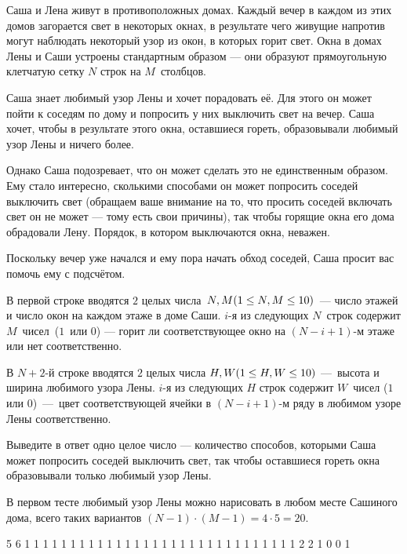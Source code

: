 
Саша и Лена живут в противоположных домах. Каждый вечер в каждом из этих домов загорается свет в некоторых окнах, в результате чего живущие напротив могут наблюдать некоторый узор из окон, в которых горит свет. Окна в домах Лены и Саши устроены стандартным образом — они образуют прямоугольную клетчатую сетку $N$ строк на $M$ столбцов.

Саша знает любимый узор Лены и хочет порадовать её. Для этого он может пойти к соседям по дому и попросить у них выключить свет на вечер. Саша хочет, чтобы в результате этого окна, оставшиеся гореть, образовывали любимый узор Лены и ничего более. 

Однако Саша подозревает, что он может сделать это не единственным образом. Ему стало интересно, сколькими способами он может попросить соседей выключить свет (обращаем ваше внимание на то, что просить соседей включать свет он не может — тому есть свои причины), так чтобы горящие окна его дома обрадовали Лену. Порядок, в котором выключаются окна, неважен.

Поскольку вечер уже начался и ему пора начать обход соседей, Саша просит вас помочь ему с подсчётом.


В первой строке вводятся $2$ целых числа $N, M \space (1\leq N, M \leq 10)$ — число этажей и число окон на каждом этаже в доме Саши. $i$-я из следующих $N$ строк содержит $M$ чисел ($1$ или $0$) — горит ли соответствующее окно на $(N-i+1)$-м этаже или нет соответственно.

В $N+2$-й строке вводятся $2$ целых числа $H, W\space(1\leq H,W \leq 10)$ — высота и ширина любимого узора Лены. $i$-я из следующих $H$ строк содержит $W$ чисел ($1$ или $0$) — цвет соответствующей ячейки в $(N-i+1)$-м ряду в любимом узоре Лены соответственно.

\outputfmtSection

Выведите в ответ одно целое число — количество способов, которыми Саша может попросить соседей выключить свет, так чтобы оставшиеся гореть окна образовывали только любимый узор Лены.

\explanationSection

В первом тесте любимый узор Лены можно нарисовать в любом месте Сашиного дома, всего таких вариантов $(N - 1) \cdot (M - 1) = 4 \cdot 5 = 20$.


\begin{myverbbox}[\small]{\vinput}
    5 6
    1 1 1 1 1 1
    1 1 1 1 1 1
    1 1 1 1 1 1
    1 1 1 1 1 1
    1 1 1 1 1 1
    2 2
    1 0
    0 1
\end{myverbbox}

